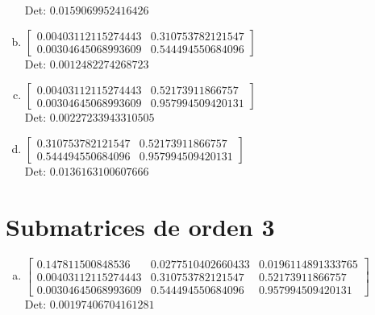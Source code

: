 \documentclass[12pt]{article}
\begin{document}
\begin{enumerate}[a)]
Det: $0.0159069952416426$\\

\item $\displaystyle \left[\begin{matrix}0.00403112115274443 & 0.310753782121547\\0.00304645068993609 & 0.544494550684096\end{matrix}\right]$\\

Det: $0.0012482274268723$\\

\item $\displaystyle \left[\begin{matrix}0.00403112115274443 & 0.52173911866757\\0.00304645068993609 & 0.957994509420131\end{matrix}\right]$\\

Det: $0.00227233943310505$\\

\item $\displaystyle \left[\begin{matrix}0.310753782121547 & 0.52173911866757\\0.544494550684096 & 0.957994509420131\end{matrix}\right]$\\

Det: $0.0136163100607666$\\

\end{enumerate}


\section*{Submatrices de orden 3}

\begin{enumerate}[a)]

\item $\displaystyle \left[\begin{matrix}0.147811500848536 & 0.0277510402660433 & 0.0196114891333765\\0.00403112115274443 & 0.310753782121547 & 0.52173911866757\\0.00304645068993609 & 0.544494550684096 & 0.957994509420131\end{matrix}\right]$\\

Det: $0.00197406704161281$\\

\end{enumerate}
\end{document}
